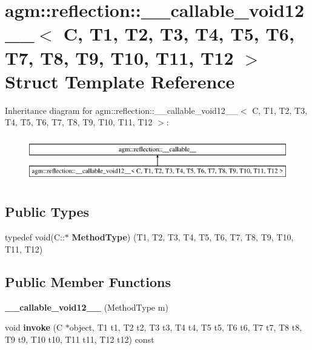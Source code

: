 \hypertarget{structagm_1_1reflection_1_1____callable__void12____}{}\section{agm\+:\+:reflection\+:\+:\+\_\+\+\_\+callable\+\_\+void12\+\_\+\+\_\+$<$ C, T1, T2, T3, T4, T5, T6, T7, T8, T9, T10, T11, T12 $>$ Struct Template Reference}
\label{structagm_1_1reflection_1_1____callable__void12____}
Inheritance diagram for agm\+:\+:reflection\+:\+:\+\_\+\+\_\+callable\+\_\+void12\+\_\+\+\_\+$<$ C, T1, T2, T3, T4, T5, T6, T7, T8, T9, T10, T11, T12 $>$\+:\begin{figure}[H]
\begin{center}
\leavevmode
\includegraphics[height=2.000000cm]{structagm_1_1reflection_1_1____callable__void12____}
\end{center}
\end{figure}
\subsection*{Public Types}
\begin{DoxyCompactItemize}
\item 
typedef void(C\+::$\ast$ {\bfseries Method\+Type}) (T1, T2, T3, T4, T5, T6, T7, T8, T9, T10, T11, T12)\hypertarget{structagm_1_1reflection_1_1____callable__void12_____aee08a5f3d07be22ba11b6b14c61b1d76}{}\label{structagm_1_1reflection_1_1____callable__void12_____aee08a5f3d07be22ba11b6b14c61b1d76}

\end{DoxyCompactItemize}
\subsection*{Public Member Functions}
\begin{DoxyCompactItemize}
\item 
{\bfseries \+\_\+\+\_\+callable\+\_\+void12\+\_\+\+\_\+} (Method\+Type m)\hypertarget{structagm_1_1reflection_1_1____callable__void12_____ad77a75611916f992f105bfd603a0a19c}{}\label{structagm_1_1reflection_1_1____callable__void12_____ad77a75611916f992f105bfd603a0a19c}

\item 
void {\bfseries invoke} (C $\ast$object, T1 t1, T2 t2, T3 t3, T4 t4, T5 t5, T6 t6, T7 t7, T8 t8, T9 t9, T10 t10, T11 t11, T12 t12) const \hypertarget{structagm_1_1reflection_1_1____callable__void12_____a79dc9f0be346a3d72a676d819a204285}{}\label{structagm_1_1reflection_1_1____callable__void12_____a79dc9f0be346a3d72a676d819a204285}

\end{DoxyCompactItemize}
